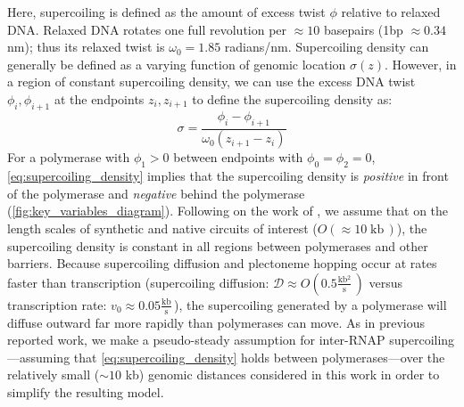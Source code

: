 \documentclass[11pt]{article}
\newcommand{\units}[2]{\frac{\text{#1}}{\text{#2}}\,}
\newcommand{\unit}[1]{\; \text{#1}\,}
\begin{document}
Here, supercoiling is defined as the amount of excess twist \(\phi\) relative to relaxed DNA. Relaxed DNA rotates  one full revolution per \(\approx10\) basepairs (1bp \(\approx 0.34\) nm); thus its relaxed twist is \(\omega_0 = 1.85\) radians/nm. Supercoiling density can generally be defined as a varying function of genomic location \(\sigma(z)\). However, in a region of constant supercoiling density, we can use the excess DNA twist \(\phi_i, \phi_{i+1}\) at the endpoints \(z_i, z_{i+1}\) to define the supercoiling density as:
\begin{equation}
    \sigma = \frac{\phi_i - \phi_{i+1}}{\omega_0 (z_{i+1} - z_{i})}
\label{eq:supercoiling_density}
\end{equation}
For a polymerase with \(\phi_1 > 0\) between endpoints with \(\phi_0 = \phi_2 = 0\), \cref{eq:supercoiling_density} implies that the supercoiling density is \emph{positive} in front of the polymerase and \emph{negative} behind the polymerase (\cref{fig:key_variables_diagram}). Following on the work of \textcite{sevierPropertiesGeneExpression2018}, we assume that on the length scales of synthetic and native circuits of interest (\(O(\approx10 \unit{kb})\)), the supercoiling density is constant in all regions between polymerases and other barriers. Because supercoiling diffusion and plectoneme hopping \parencite{loenhoutDynamicsDNASupercoils2012} occur at rates faster than transcription (supercoiling diffusion: \(\mathcal{D} \approx O(0.5 \units{kb$^2$}{s})\) versus transcription rate: \(v_0 \approx 0.05 \units{kb}{s}\))\parencite{munizRNAPolymeraseII2021}, the supercoiling generated by a polymerase will diffuse outward far more rapidly than polymerases can move. As in previous reported work, we make a pseudo-steady assumption for inter-RNAP supercoiling---assuming that \cref{eq:supercoiling_density} holds between polymerases---over the relatively small (\(\sim 10\) kb) genomic distances considered in this work in order to simplify the resulting model.
\end{document}
